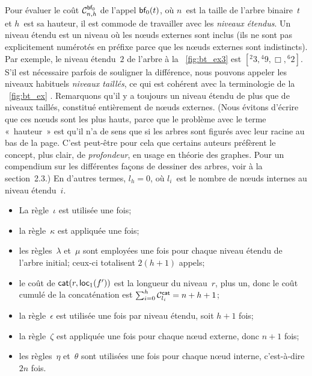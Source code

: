 Pour évaluer le coût
\(\C{\fun{bf}_0}{n,h}\) de l'appel
\(\fun{bf}_0(t)\), où \(n\)~est la taille de l'arbre binaire~\(t\) et
\(h\)~est sa hauteur, il est commode de
travailler avec les \emph{niveaux étendus}. Un niveau étendu est un niveau où les n{\oe}uds externes
sont inclus (ils ne sont pas explicitement numérotés en préfixe parce
que les n{\oe}uds externes sont indistincts). Par exemple, le niveau
étendu~\(2\) de l'arbre à la \fig~\vref{fig:bt_ex3} est \([{}^{2}{3},
{}^{4}{9}, \Box, {}^{6}{2}]\). S'il est nécessaire parfois de
souligner la différence, nous pouvons appeler les niveaux habituels
\emph{niveaux taillés}, ce qui est cohérent avec la terminologie de la
\fig~\ref{fig:bt_ex} . Remarquons qu'il y a
toujours un niveau étendu de plus que de niveaux taillés, constitué
entièrement de n{\oe}uds externes. (Nous évitons d'écrire que ces
n{\oe}uds sont les plus hauts, parce que le problème avec le terme
«~hauteur~» est qu'il n'a de sens que si les arbres
sont figurés avec leur racine au bas de la page. C'est peut-être pour
cela que certains auteurs préfèrent le concept, plus clair, de
\emph{profondeur}, en usage en théorie
des graphes. Pour un compendium sur les différentes façons de dessiner
des arbres, voir \cite{Knuth_1997} à la section~2.3.) En d'autres
termes, \(l_h=0\), où \(l_i\)~est le nombre de n{\oe}uds internes au
niveau étendu~\(i\).
\begin{itemize}

  \item La règle~\(\iota\) est utilisée une fois;

  \item la règle~\(\kappa\) est appliquée une fois;

  \item les règles~\(\lambda\) et~\(\mu\) sont employées une fois pour
    chaque niveau étendu de l'arbre initial; ceux-ci totalisent
    \(2(h+1)\) appels;

  \item le coût de \(\fun{cat}(r,\fun{loc}_1(f'))\) est la longueur du
    niveau~\(r\), plus un, donc le coût cumulé de la concaténation est
    \(\sum_{i=0}^{h}\C{\fun{cat}}{l_i} = n + h + 1\);

  \item la règle~\(\epsilon\) est utilisée une fois par niveau étendu,
    soit \(h+1\) fois;

  \item la règle~\(\zeta\) est appliquée une fois pour chaque n{\oe}ud
    externe, donc \(n+1\) fois;

  \item les règles~\(\eta\) et~\(\theta\) sont utilisées une fois pour
    chaque n{\oe}ud interne, c'est-à-dire \(2n\) fois.

\end{itemize}
